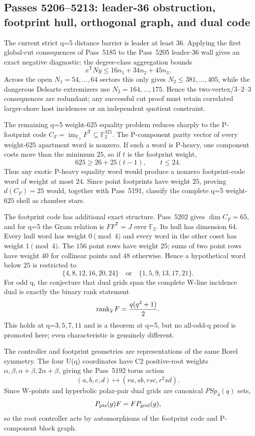 \ifdefined\WPassFiveTwoZeroSixLoaded\else
\gdef\WPassFiveTwoZeroSixLoaded{1}
\subsection*{Passes 5206--5213: leader-36 obstruction, footprint hull, orthogonal graph, and dual code}
The current strict q=5 distance barrier is leader at least $36$.  Applying the first global-cut consequences of Pass~5185 to the Pass~5205 leader-$36$ wall gives an exact negative diagnostic: the degree-class aggregation bounds
\[
 x^{\mathsf T}Ny\le16n_1+34n_2+45n_3.
\]
Across the open $N_1=54,\ldots,64$ sectors this only gives $N_2\le381,\ldots,405$, while the dangerous Delsarte extremizers use $N_2=164,\ldots,175$.  Hence the two-vertex/$3$--$2$--$3$ consequences are redundant; any successful cut proof must retain correlated larger-shore host incidences or an independent quotient constraint.

The remaining q=5 weight-$625$ equality problem reduces sharply to the P-footprint code $C_F=\operatorname{im}_{\mathbb F_2}F^{\mathsf T}\subseteq\mathbb F_2^{325}$.  The P-component parity vector of every weight-$625$ apartment word is nonzero.  If such a word is P-heavy, one component costs more than the minimum $25$, so if $t$ is the footprint weight,
\[
 625\ge26+25(t-1),\qquad t\le24.
\]
Thus any exotic P-heavy equality word would produce a nonzero footprint-code word of weight at most $24$.  Since point footprints have weight $25$, proving $d(C_F)=25$ would, together with Pass~5191, classify the complete q=5 weight-$625$ shell as chamber stars.

The footprint code has additional exact structure.  Pass~5202 gives $\dim C_F=65$, and for q=5 the Gram relation is $FF^{\mathsf T}=J$ over $\mathbb F_2$.  Its hull has dimension $64$.  Every hull word has weight $0\pmod4$ and every word in the other coset has weight $1\pmod4$.  The $156$ point rows have weight $25$; sums of two point rows have weight $40$ for collinear points and $48$ otherwise.  Hence a hypothetical word below $25$ is restricted to
\[
 \{4,8,12,16,20,24\}\quad\text{or}\quad\{1,5,9,13,17,21\}.
\]
For odd q, the conjecture that dual grids span the complete W-line incidence dual is exactly the binary rank statement
\[
 \operatorname{rank}_2F={q(q^2+1)\over2}.
\]
This holds at q=$3,5,7,11$ and is a theorem at q=5, but no all-odd-q proof is promoted here; even characteristic is genuinely different.

The controller and footprint geometries are representations of the same Borel symmetry.  The four U(q) coordinates have C2 positive-root weights $\alpha,\beta,\alpha+\beta,2\alpha+\beta$, giving the Pass~5192 torus action
\[
 (a,b,c,d)\mapsto(ra,sb,rsc,r^2sd).
\]
Since W-points and hyperbolic polar-pair dual grids are canonical $PSp_4(q)$ sets,
\[
 P_{\rm pts}(g)F=F P_{\rm grid}(g),
\]
so the root controller acts by automorphisms of the footprint code and P-component block graph.

